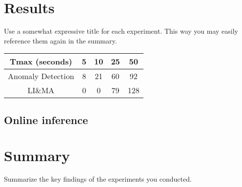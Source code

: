 \section{Results}
\label{s:Experiment-Results}

Use a somewhat expressive title for each experiment. This way you may easily reference them again in the summary.
\begin{table}[h]
\begin{center}
\begin{tabular}{|c|c|c|c|c|}
\hline
Tmax (seconds) & 5 & 10 & 25 & 50 \\
\hline
Anomaly Detection & 8 & 21 & 60 & 92 \\
\hline
LI\&MA & 0 & 0 & 79 & 128 \\
\hline
\end{tabular}
\end{center}
\end{table}





\subsection{Online inference}
\label{s:Online-inference}









\section{Summary}
\label{s:Experiments-Summary}

Summarize the key findings of the experiments you conducted.
